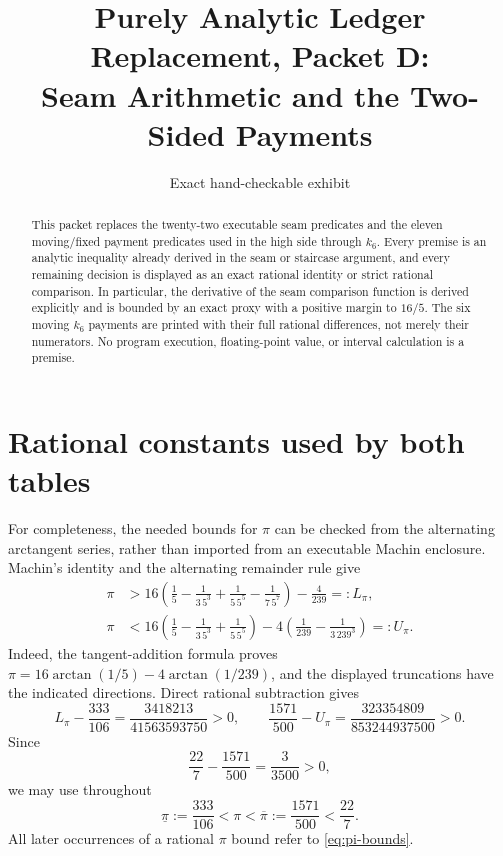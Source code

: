\documentclass[11pt]{article}
\title{Purely Analytic Ledger Replacement, Packet D:\\
Seam Arithmetic and the Two-Sided Payments}
\author{}
\date{Exact hand-checkable exhibit}
\theoremstyle{remark}
\newcommand{\pibar}{\overline\pi}
\newcommand{\piunder}{\underline\pi}
\begin{document}
\maketitle

\begin{abstract}
This packet replaces the twenty-two executable seam predicates and the
eleven moving/fixed payment predicates used in the high side through
$k_6$.  Every premise is an analytic inequality already derived in the
seam or staircase argument, and every remaining decision is displayed as
an exact rational identity or strict rational comparison.  In particular,
the derivative of the seam comparison function is derived explicitly and
is bounded by an exact proxy with a positive margin to $16/5$.  The six
moving $k_6$ payments are printed with their full rational differences,
not merely their numerators.  No program execution, floating-point value,
or interval calculation is a premise.
\end{abstract}

\section{Rational constants used by both tables}

For completeness, the needed bounds for $\pi$ can be checked from the
alternating arctangent series, rather than imported from an executable
Machin enclosure.  Machin's identity and the alternating remainder rule
give
\begin{align*}
 \pi
 &>16\left(\frac15-\frac1{3\,5^3}
       +\frac1{5\,5^5}-\frac1{7\,5^7}\right)-\frac4{239}
 =:L_\pi,\\
 \pi
 &<16\left(\frac15-\frac1{3\,5^3}
       +\frac1{5\,5^5}\right)
 -4\left(\frac1{239}-\frac1{3\,239^3}\right)
 =:U_\pi.
\end{align*}
Indeed, the tangent-addition formula proves
$\pi=16\arctan(1/5)-4\arctan(1/239)$, and the displayed truncations have
the indicated directions.  Direct rational subtraction gives
\begin{equation}
 L_\pi-\frac{333}{106}
 =\frac{3418213}{41563593750}>0,
 \qquad
 \frac{1571}{500}-U_\pi
 =\frac{323354809}{853244937500}>0.
 \label{eq:machin-gaps}
\end{equation}
Since
\begin{equation}
 \frac{22}{7}-\frac{1571}{500}=\frac3{3500}>0,
 \label{eq:pi-upper-chain}
\end{equation}
we may use throughout
\begin{equation}
 \piunder:=\frac{333}{106}<\pi<
 \pibar:=\frac{1571}{500}<\frac{22}{7}.
 \label{eq:pi-bounds}
\end{equation}
All later occurrences of a rational $\pi$ bound refer to
\eqref{eq:pi-bounds}.
\end{document}
